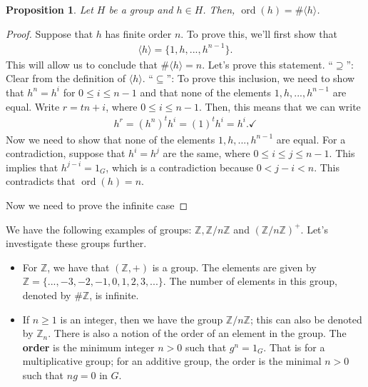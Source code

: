 \documentclass[psamsfonts]{amsart}
\newtheorem{prop}[thm]{Proposition}
\theoremstyle{definition}
\theoremstyle{remark}
\newcommand{\Z}[0]{\mathbb{Z}}
\numberwithin{equation}{section}
\begin{document}
\begin{prop}
	Let \( H \) be a group and \( h \in H \). Then, \( \operatorname{ord}(h) = \# \langle h \rangle \).
\end{prop}

\begin{proof}
	Suppose that \( h \) has finite order \( n \). To prove this, we'll first show that
	\begin{align*}
		\langle h \rangle = \{ 1, h, ..., h^{n-1} \}.
	\end{align*}
	This will allow us to conclude that \( \# \langle h \rangle = n \). Let's prove this statement. 
	\newline
	``\( \supseteq \)'': Clear from the definition of \( \langle h \rangle \).
	\newline
	``\( \subseteq \)'': To prove this inclusion, we need to show that \( h^n = h^i \) for \( 0 \leq i \leq n -1 \) and that none of the elements \( 1, h, ..., h^{n-1} \) are equal. Write \( r = tn + i \), where \( 0 \leq i \leq n-1 \). Then, this means that we can write
	\begin{align}
		h^r = (h^n)^t h^i = (1)^t h^i = h^i. \checkmark
	\end{align}
	Now we need to show that none of the elements \( 1, h, ..., h^{n-1} \) are equal. For a contradiction, suppose that \( h^i = h^j \) are the same, where \( 0 \leq i \leq j \leq n-1 \). This implies that \( h^{j-i} = 1_G \), which is a contradiction because \( 0 < j-i < n \). This contradicts that \( \operatorname{ord}(h) = n \).
	
	Now we need to prove the infinite case 
\end{proof}



We have the following examples of groups: \( \Z, \Z / n\Z \) and \( (\Z / n \Z)^+ \). Let's investigate these groups further.
\begin{itemize}
	\item For \( \Z \), we have that \( (\Z, + ) \) is a group. The elements are given by \( \Z = \{ ..., -3, -2, -1, 0, 1, 2, 3, ... \} \). The number of elements in this group, denoted by \( \# \Z \), is infinite.
	\item If \( n \geq 1 \) is an integer, then we have the group \( \Z / n \Z \); this can also be denoted by \( \Z_n \). There is also a notion of the order of an element in the group. The \textbf{order} is the minimum integer \( n > 0 \) such that \( g^n = 1_G \). That is for a multiplicative group; for an additive group, the order is the minimal \( n > 0 \) such that \( ng = 0 \) in \( G \).
\end{itemize}
\end{document}
